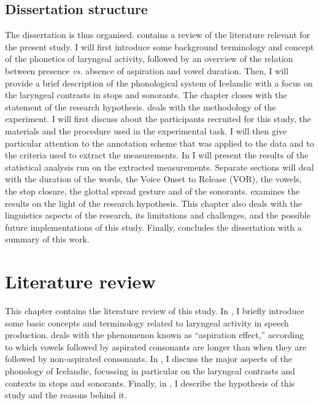 \documentclass[11pt,a4paper,openany]{memoir}\usepackage[]{graphicx}\usepackage[]{color}
\begin{document}
\section{Dissertation structure}
The dissertation is thus organised.
 contains a review of the literature relevant for the present study.
I will first introduce some background terminology and concept of the phonetics of laryngeal activity, followed by an overview of the relation between presence \textit{vs.} absence of aspiration and vowel duration.
Then, I will provide a brief description of the phonological system of Icelandic with a focus on the laryngeal contrasts in stops and sonorants.
The chapter closes with the statement of the research hypothesis.
 deals with the methodology of the experiment.
I will first discuss about the participants recruited for this study, the materials and the procedure used in the experimental task.
I will then give particular attention to the annotation scheme that was applied to the data and to the criteria used to extract the measurements.
In  I will present the results of the statistical analysis run on the extracted measurements.
Separate sections will deal with the duration of the words, the Voice Onset to Release (VOR), the vowels, the stop closure, the glottal spread gesture and of the sonorants.
 examines the results on the light of the research hypothesis.
This chapter also deals with the linguistics aspects of the research, its limitations and challenges, and the possible future implementations of this study.
Finally, concludes the dissertation with a summary of this work.



\chapter{Literature review}
\label{c:review}
This chapter contains the literature review of this study.
In , I briefly introduce some basic concepts and terminology related to laryngeal activity in speech production.
 deals with the phenomenon known as ``aspiration effect,'' according to which vowels followed by aspirated consonants are longer than when they are followed by non-aspirated consonants.
In , I discuss the major aspects of the phonology of Icelandic, focussing in particular on the laryngeal contrasts and contexts in stops and sonorants.
Finally, in , I describe the hypothesis of this study and the reasons behind it.
\end{document}
